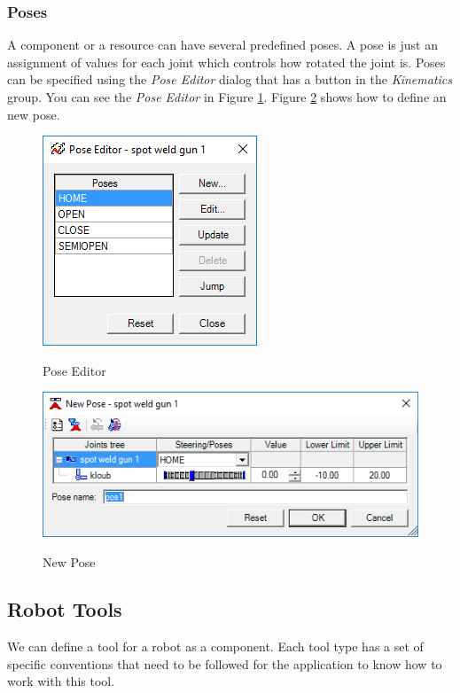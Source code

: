 \subsubsection{Poses}
A component or a resource can have several predefined poses. 
A pose is just an assignment of values for each joint which controls how rotated the joint is. 
Poses can be specified using the \emph{Pose Editor} dialog that has a button in the \emph{Kinematics} group. You can see the \emph{Pose Editor} in Figure \ref{fig:PoseEditor}. Figure \ref{fig:NewPose} shows how to define an new pose.\\

\begin{figure}[H]
    \caption{Pose Editor}
    \centering
    \includegraphics{pose_editor}
    \label{fig:PoseEditor}
\end{figure}
\begin{figure}[H]
    \caption{New Pose}
    \centering
    \includegraphics{new_pose}
    \label{fig:NewPose}
\end{figure}

\subsection{Robot Tools}
We can define a tool for a robot as a component.
Each tool type has a set of specific conventions that need to be followed for the application to know how to work with this tool. \\

